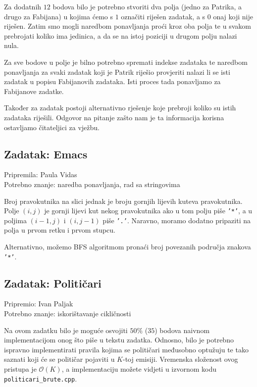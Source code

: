 \documentclass[a4paper]{article}
\begin{document}
Za dodatnih $12$ bodova bilo je potrebno stvoriti dva polja (jedno za Patrika, a
drugo za Fabijana) u kojima ćemo s $1$ označiti riješen zadatak, a s $0$ onaj koji
nije riješen. Zatim smo mogli naredbom ponavljanja proći kroz oba polja te u
svakom prebrojati koliko ima jedinica, a da se na istoj poziciji u drugom
polju nalazi nula.

Za sve bodove u polje je bilno potrebno spremati indekse zadataka te
naredbom ponavljanja za svaki zadatak koji je Patrik riješio provjeriti nalazi
li se isti zadatak u popisu Fabijanovih zadataka. Isti proces tada ponavljamo
za Fabijanove zadatke.

Također za zadatak postoji alternativno rješenje koje prebroji koliko
su istih zadataka riješili. Odgovor na pitanje zašto nam je ta informacija
korisna ostavljamo čitateljici za vježbu.

\clearpage

\subsection*{Zadatak: Emacs}
\textsf{Pripremila: Paula Vidas}\\
\textsf{Potrebno znanje: naredba ponavljanja, rad sa stringovima}

Broj pravokutnika na slici jednak je broju gornjih lijevih kuteva pravokutnika.
Polje $(i, j)$ je gornji lijevi kut nekog pravokutnika ako u tom polju piše
\texttt{'*'}, a u poljima $(i - 1, j)$ i $(i, j - 1)$ piše \texttt{'.'}.
Naravno, moramo dodatno pripaziti na polja u prvom retku i prvom stupcu.

Alternativno, možemo BFS algoritmom pronaći broj povezanih područja znakova
\texttt{'*'}.

\subsection*{Zadatak: Političari}
\textsf{Pripremio: Ivan Paljak}\\
\textsf{Potrebno znanje: iskorištavanje cikličnosti}

Na ovom zadatku bilo je moguće osvojiti $50\%$ ($35$) bodova naivnom implementacijom
onog što piše u tekstu zadatka. Odnosno, bilo je potrebno ispravno
implementirati pravila kojima se političari međusobno optužuju te tako saznati
koji će se političar pojaviti u $K$-toj emisiji. Vremenska složenost ovog
pristupa je $\mathcal{O}(K)$, a implementaciju možete vidjeti u izvornom kodu
\texttt{politicari\_brute.cpp}.
\end{document}
